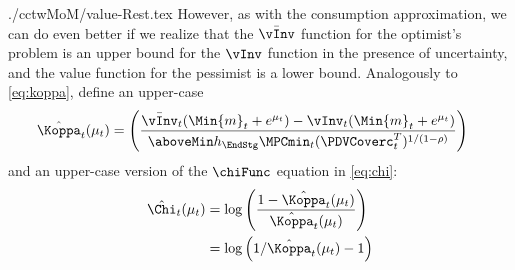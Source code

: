 \documentclass[SolvingMicroDSOPs]{subfiles}
\begin{document}
\begin{verbatimwrite}{./cctwMoM/value-Rest.tex}
  However, as with the consumption approximation, we can do even better if we
  realize that the $\bar{\vInv}$ function for the optimist's problem is
  an upper bound for the ${\vInv}$ function in the presence of uncertainty, and the value function
  for the pessimist is a lower bound. Analogously to \eqref{eq:koppa}, define an upper-case
  \begin{equation}\begin{gathered}\begin{aligned}
        \hat{\Koppa}_{\prd}(\mu_{\prd})   & = \left(\frac{\bar{\vInv}_{\prd}(\Min{m}_{\prd}+e^{\mu_{\prd}})-\vInv_{\prd}(\Min{m}_{\prd}+e^{\mu_{\prd}})}{\aboveMin \hNrm_{\EndStg} \MPCmin_{\prd} (\PDVCoverc_{\prd}^{T})^{1/(1-\CRRA)}}\right) \label{eq:Koppa}
      \end{aligned}\end{gathered}\end{equation}
  and an upper-case version of the $\chiFunc$ equation in \eqref{eq:chi}:
  \begin{equation}\begin{gathered}\begin{aligned}
        \hat{\Chi}_{\prd}(\mu_{\prd})  & = \log \left(\frac{1-\hat{\Koppa}_{\prd}(\mu_{\prd})}{\hat{\Koppa}_{\prd}(\mu_{\prd})}\right)
        \\  & = \log \left(1/\hat{\Koppa}_{\prd}(\mu_{\prd})-1\right) \label{eq:Chi}
      \end{aligned}\end{gathered}\end{equation}
\end{verbatimwrite}
\end{document}
